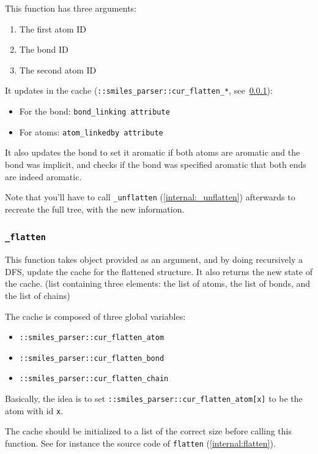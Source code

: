 \documentclass[a4paper, 11pt]{article}
\begin{document}
This function has three arguments:
\begin{enumerate}
    \item The first atom ID
    \item The bond ID
    \item The second atom ID
\end{enumerate}

It updates in the cache (\texttt{::smiles\_parser::cur\_flatten\_*}, see~\ref{internal:_flatten}):
\begin{itemize}
    \item For the bond: \tt{bond\_linking} attribute
    \item For atoms: \tt{atom\_linkedby} attribute
\end{itemize}

It also updates the bond to set it aromatic if both atoms are aromatic and the bond was implicit, and checks if the bond was specified aromatic that both ends are indeed aromatic.

Note that you'll have to call {\tt \_unflatten} (\ref{internal:_unflatten}) afterwards to recreate the full tree, with the new information.

\subsubsection{\tt \_flatten}\label{internal:_flatten}

This function takes object provided as an argument, and by doing recursively a DFS, update the cache for the flattened structure. It also returns the new state of the cache. (list containing three elements: the list of atoms, the list of bonds, and the list of chains)

The cache is composed of three global variables:
\begin{itemize}
    \item \texttt{::smiles\_parser::cur\_flatten\_atom}
    \item \texttt{::smiles\_parser::cur\_flatten\_bond}
    \item \texttt{::smiles\_parser::cur\_flatten\_chain}
\end{itemize}

Basically, the idea is to set \texttt{::smiles\_parser::cur\_flatten\_atom[x]} to be the atom with id \texttt{x}.

The cache should be initialized to a list of the correct size before calling this function. See for instance the source code of {\tt flatten} (\ref{internal:flatten}).
\end{document}
